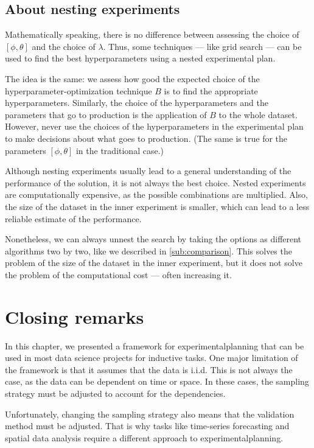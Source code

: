 \subsection{About nesting experiments}

Mathematically speaking, there is no difference between assessing the choice of
$\left[\phi, \theta\right]$ and the choice of $\lambda$.  Thus, some techniques --- like
grid search --- can be used to find the best \glspl{hyperparameter} using a nested experimental
plan.

The idea is the same: we assess how good the expected choice of the
\gls{hyperparameter}-optimization technique $B$ is to find the appropriate \glspl{hyperparameter}.  Similarly,
the choice of the \glspl{hyperparameter} and the parameters that go to production is the
application of $B$ to the whole dataset.  However, never use the choices of the
\glspl{hyperparameter} in the experimental plan to make decisions about what goes to production.
(The same is true for the parameters $\left[\phi, \theta\right]$ in the traditional case.)

Although nesting experiments usually lead to a general understanding of the performance of
the solution, it is not always the best choice.  Nested experiments are computationally
expensive, as the possible combinations are multiplied.  Also, the size of the dataset
in the inner experiment is smaller, which can lead to a less reliable estimate of the
performance.

Nonetheless, we can always unnest the search by taking the options as different
algorithms two by two, like we described in \cref{sub:comparison}.  This solves the
problem of the size of the dataset in the inner experiment, but it does not solve the
problem of the computational cost --- often increasing it.

\section{Closing remarks}

In this chapter, we presented a framework for \gls{experimentalplanning} that can be used in
most data science projects for inductive tasks.  One major limitation of the framework is
that it assumes that the data is i.i.d.  This is not always the case, as the data can be
dependent on time or space.  In these cases, the sampling strategy must be adjusted to
account for the dependencies.

Unfortunately, changing the sampling strategy also means that the validation method must
be adjusted.  That is why tasks like time-series forecasting and spatial data analysis
require a different approach to \gls{experimentalplanning}.

